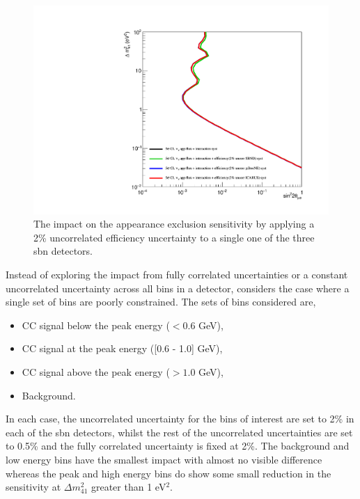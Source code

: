 \begin{figure}[h!]
    \centering
    \includegraphics[width = \largefigwidth]{figures-chap6/exclusion_contours/efficiency_systematics/nue_app_2pct_uncor_per_detector.pdf}
    \caption[\nue app with a 2\% uncorrelated efficiency systematic for one detector only.]{The impact on the \nue appearance exclusion sensitivity by applying a 2\% uncorrelated efficiency uncertainty to a single one of the three \gls{sbn} detectors.}
    \label{fig:nue_app_uncorrelated_per_detector}
\end{figure}


Instead of exploring the impact from fully correlated uncertainties or a constant uncorrelated uncertainty across all bins in a detector,  considers the case where a single set of bins are poorly constrained. The sets of bins considered are,
\begin{itemize}
    \item CC signal below the peak energy ($< 0.6$ GeV),
    \item CC signal at the peak energy ([0.6 - 1.0] GeV),
    \item CC signal above the peak energy ($> 1.0$ GeV),
    \item Background.
\end{itemize}
In each case, the uncorrelated uncertainty for the bins of interest are set to 2\% in each of the \gls{sbn} detectors, whilst the rest of the uncorrelated uncertainties are set to 0.5\% and the fully correlated uncertainty is fixed at 2\%. The background and low energy bins have the smallest impact with almost no visible difference whereas the peak and high energy bins do show some small reduction in the sensitivity at $\Delta m^2_{41}$ greater than 1 eV$^2$.

